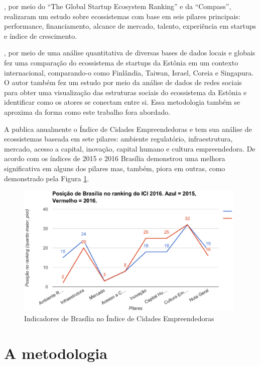 , por meio do ``The Global Startup Ecosystem Ranking'' e da ``Compass'', realizaram um estudo sobre ecossistemas com base em seis pilares principais: performance, financiamento, alcance de mercado, talento, experiência em startups e índice de crescimento. 

, por meio de uma análise quantitativa de diversas bases de dados locais e globais fez uma comparação do ecossistema de startups da Estônia em um contexto internacional, comparando-o como Finlândia, Taiwan, Israel, Coreia e Singapura. O autor também fez um estudo por meio da análise de dados de redes sociais para obter uma visualização das estruturas sociais do ecossistema da Estônia e identificar como os atores se conectam entre si. Essa metodologia também se aproxima da forma como este trabalho fora abordado.

A  publica anualmente o Índice de Cidades Empreendedoras e tem sua análise de ecossistemas baseada em sete pilares: ambiente regulatório, infraestrutura, mercado, acesso a capital, inovação, capital humano e cultura empreendedora. De acordo com os índices de 2015 e 2016 Brasília demonstrou uma melhora significativa em alguns dos pilares mas, também, piora em outras, como demonstrado pela Figura \ref{figure:ici20152016}. 

\begin{figure}[!htb]
	\centering
	\includegraphics[width=11cm,angle=0]{figuras/ici20152016}
	\caption{Indicadores de Brasília no Índice de Cidades Empreendedoras}
	\label{figure:ici20152016}
\end{figure}

\section{A metodologia}
\label{section:a_metodologia}

